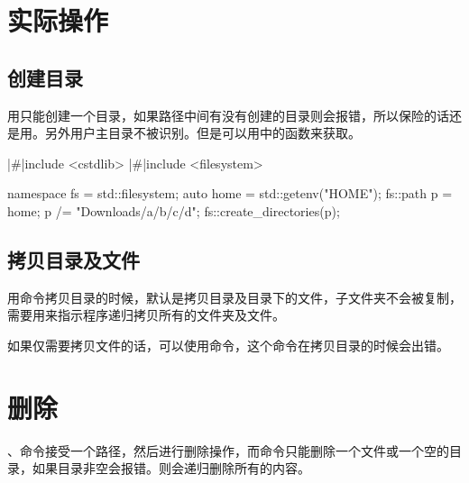 \section{实际操作}
\subsection{创建目录}
用只能创建一个目录，如果路径中间有没有创建的目录则会报错，所以保险的话还是用。另外用户主目录\cppinline{~}不被识别。但是可以用中的函数来获取。
\begin{cpplst}
|\#|include <cstdlib>
|\#|include <filesystem>

namespace fs = std::filesystem;
auto home = std::getenv("HOME");
fs::path p = home;
p /= "Downloads/a/b/c/d";
fs::create_directories(p);
\end{cpplst}

\subsection{拷贝目录及文件}
用命令拷贝目录的时候，默认是拷贝目录及目录下的文件，子文件夹不会被复制，需要用来指示程序递归拷贝所有的文件夹及文件。

如果仅需要拷贝文件的话，可以使用命令，这个命令在拷贝目录的时候会出错。

\section{删除}
、命令接受一个路径，然后进行删除操作，而命令只能删除一个文件或一个空的目录，如果目录非空会报错。则会递归删除所有的内容。
